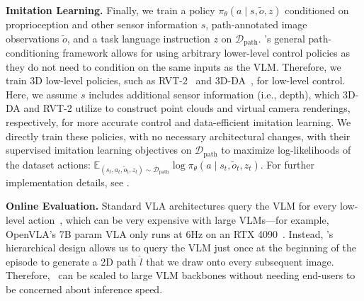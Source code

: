 \textbf{Imitation Learning.} Finally, we train a policy $\pi_\theta(a \mid s, \tilde{o}, z)$ 
conditioned on proprioception and other sensor information $s$, path-annotated image observations $\tilde{o}$, and a task language instruction $z$ on $\mathcal{D}_\text{path}$.
\method 's general path-conditioning framework allows for using arbitrary lower-level control policies as they do not need to condition on the same inputs as the VLM.
Therefore, we train 3D low-level policies, such as RVT-2~\citep{goyal2024rvt} and 3D-DA~\citep{ke20243d}, for low-level control.
Here, we assume $s$ includes additional sensor information (i.e., depth),
which 3D-DA and RVT-2 utilize to construct point clouds and virtual camera renderings, respectively, for more accurate control and data-efficient imitation learning.
We directly train these policies, with no necessary architectural changes,
with their supervised imitation learning objectives on $\mathcal{D}_\text{path}$
to maximize log-likelihoods of the dataset actions: $\mathbb{E}_{(s_t, a_t, \tilde{o}_t, z_t)\sim \mathcal{D}_\text{path}} \log \pi_\theta(a \mid s_t, \tilde{o}_t, z_t)$. 
For further implementation details, see .



\textbf{Online Evaluation.}
Standard VLA architectures query the VLM for every low-level action~\citep{kim2024openvla, rt22023arxiv}, which can be very expensive with large VLMs---for example, OpenVLA's 7B param VLA only runs at 6Hz on an RTX 4090~\citep{kim2024openvla}.
Instead, \method 's hierarchical design allows us to query the VLM just once at the beginning of the episode to generate a 2D path $\hat{l}$ that we draw onto every subsequent image.
Therefore, \method\ can be scaled to large VLM backbones without needing end-users to be concerned about inference speed.

